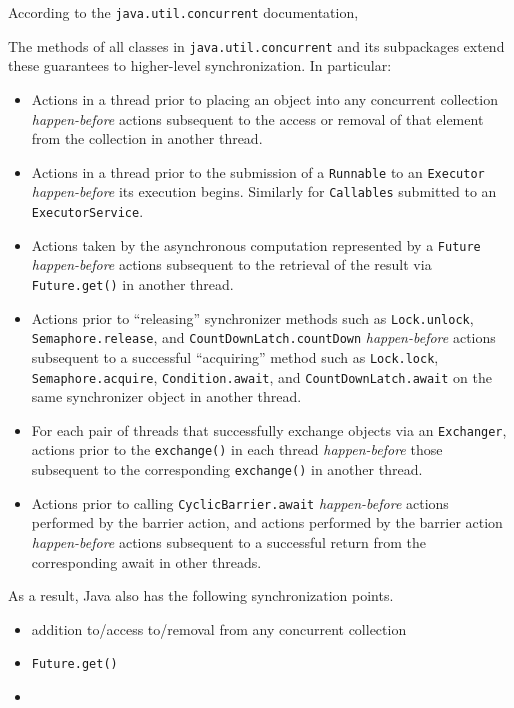\documentclass[
a4paper,
12pt,
]{report}
\newcommand{\java}{Java\texttrademark\xspace}
\begin{document}
According to the \verb!java.util.concurrent! documentation,

\begin{quoting}
  The methods of all classes in \texttt{java.util.concurrent} and its
  subpackages extend these guarantees to higher-level
  synchronization. In particular:
  \begin{itemize}
  \item Actions in a thread prior to placing an object into any
    concurrent collection \textit{happen-before} actions subsequent to
    the access or removal of that element from the collection in
    another thread.
  \item Actions in a thread prior to the submission of a
    \texttt{Runnable} to an \texttt{Executor} \textit{happen-before}
    its execution begins. Similarly for \texttt{Callables} submitted
    to an \texttt{ExecutorService}.
  \item Actions taken by the asynchronous computation represented by a
    \texttt{Future} \textit{happen-before} actions subsequent to the
    retrieval of the result via \texttt{Future.get()} in another
    thread.
  \item Actions prior to ``releasing'' synchronizer methods such as
    \texttt{Lock.unlock}, \texttt{Semaphore.release}, and
    \texttt{CountDownLatch.countDown} \textit{happen-before} actions
    subsequent to a successful ``acquiring'' method such as
    \texttt{Lock.lock}, \texttt{Semaphore.acquire},
    \texttt{Condition.await}, and \texttt{CountDownLatch.await} on the
    same synchronizer object in another thread.
  \item For each pair of threads that successfully exchange objects
    via an \texttt{Exchanger}, actions prior to the
    \texttt{exchange()} in each thread \textit{happen-before} those
    subsequent to the corresponding \texttt{exchange()} in another
    thread.
  \item Actions prior to calling \texttt{CyclicBarrier.await}
    \textit{happen-before} actions performed by the barrier action,
    and actions performed by the barrier action \textit{happen-before}
    actions subsequent to a successful return from the corresponding
    await in other threads.
  \end{itemize}
\end{quoting}

As a result, \java also has the following synchronization points.
\begin{itemize}
\item addition to/access to/removal from any concurrent collection
\item \verb!Future.get()!
\item
\end{itemize}
\end{document}
